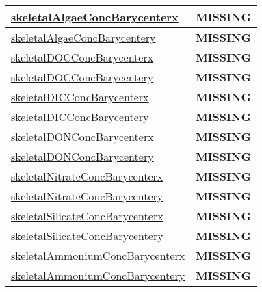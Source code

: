 {\begin{center}
\begin{longtable}{| p{2.0in} | p{4.0in} |}
    \hline
    \hyperref[subsec:var_sec_tracer_barycenter_skeletalAlgaeConcBarycenterx]{skeletalAlgaeConcBarycenterx} & {\bf \color{red} MISSING} \\
    \hline
    \hyperref[subsec:var_sec_tracer_barycenter_skeletalAlgaeConcBarycentery]{skeletalAlgaeConcBarycentery} & {\bf \color{red} MISSING} \\
    \hline
    \hyperref[subsec:var_sec_tracer_barycenter_skeletalDOCConcBarycenterx]{skeletalDOCConcBarycenterx} & {\bf \color{red} MISSING} \\
    \hline
    \hyperref[subsec:var_sec_tracer_barycenter_skeletalDOCConcBarycentery]{skeletalDOCConcBarycentery} & {\bf \color{red} MISSING} \\
    \hline
    \hyperref[subsec:var_sec_tracer_barycenter_skeletalDICConcBarycenterx]{skeletalDICConcBarycenterx} & {\bf \color{red} MISSING} \\
    \hline
    \hyperref[subsec:var_sec_tracer_barycenter_skeletalDICConcBarycentery]{skeletalDICConcBarycentery} & {\bf \color{red} MISSING} \\
    \hline
    \hyperref[subsec:var_sec_tracer_barycenter_skeletalDONConcBarycenterx]{skeletalDONConcBarycenterx} & {\bf \color{red} MISSING} \\
    \hline
    \hyperref[subsec:var_sec_tracer_barycenter_skeletalDONConcBarycentery]{skeletalDONConcBarycentery} & {\bf \color{red} MISSING} \\
    \hline
    \hyperref[subsec:var_sec_tracer_barycenter_skeletalNitrateConcBarycenterx]{skeletalNitrateConcBarycenterx} & {\bf \color{red} MISSING} \\
    \hline
    \hyperref[subsec:var_sec_tracer_barycenter_skeletalNitrateConcBarycentery]{skeletalNitrateConcBarycentery} & {\bf \color{red} MISSING} \\
    \hline
    \hyperref[subsec:var_sec_tracer_barycenter_skeletalSilicateConcBarycenterx]{skeletalSilicateConcBarycenterx} & {\bf \color{red} MISSING} \\
    \hline
    \hyperref[subsec:var_sec_tracer_barycenter_skeletalSilicateConcBarycentery]{skeletalSilicateConcBarycentery} & {\bf \color{red} MISSING} \\
    \hline
    \hyperref[subsec:var_sec_tracer_barycenter_skeletalAmmoniumConcBarycenterx]{skeletalAmmoniumConc\-Barycenterx} & {\bf \color{red} MISSING} \\
    \hline
    \hyperref[subsec:var_sec_tracer_barycenter_skeletalAmmoniumConcBarycentery]{skeletalAmmoniumConc\-Barycentery} & {\bf \color{red} MISSING} \\

\end{longtable}
\end{center}}
